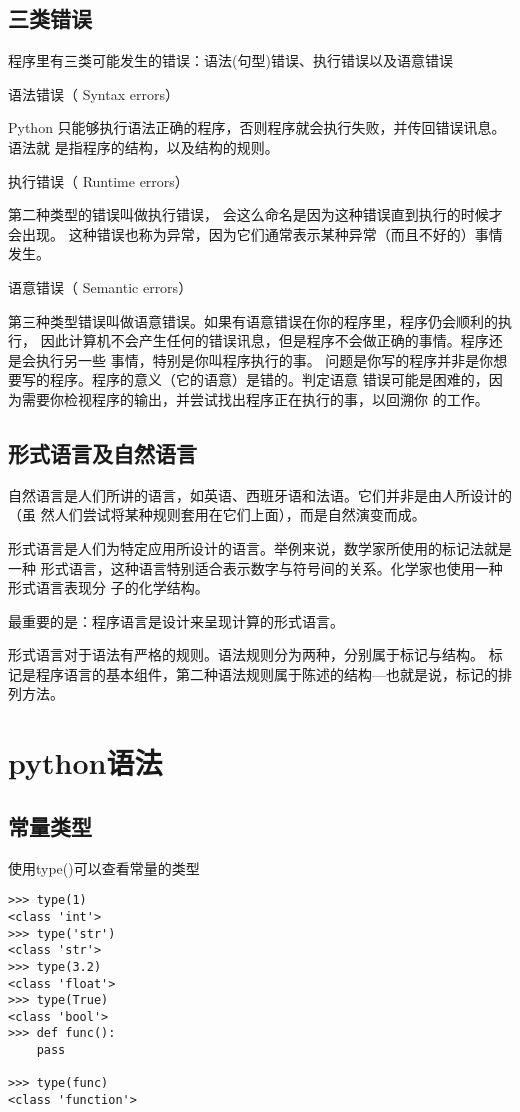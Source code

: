 \documentclass[twoside,11pt]{book}
\begin{document}
\subsection{三类错误}
程序里有三类可能发生的错误：语法(句型)错误、执行错误以及语意错误

语法错误（ Syntax errors）

Python 只能够执行语法正确的程序，否则程序就会执行失败，并传回错误讯息。 语法就
是指程序的结构，以及结构的规则。

执行错误（ Runtime errors）

第二种类型的错误叫做执行错误， 会这么命名是因为这种错误直到执行的时候才会出现。
这种错误也称为异常，因为它们通常表示某种异常（而且不好的）事情发生。

语意错误（ Semantic errors）

第三种类型错误叫做语意错误。如果有语意错误在你的程序里，程序仍会顺利的执行，
因此计算机不会产生任何的错误讯息，但是程序不会做正确的事情。程序还是会执行另一些
事情，特别是你叫程序执行的事。
问题是你写的程序并非是你想要写的程序。程序的意义（它的语意）是错的。判定语意
错误可能是困难的，因为需要你检视程序的输出，并尝试找出程序正在执行的事，以回溯你
的工作。

\subsection{形式语言及自然语言}
自然语言是人们所讲的语言，如英语、西班牙语和法语。它们并非是由人所设计的（虽
然人们尝试将某种规则套用在它们上面），而是自然演变而成。

形式语言是人们为特定应用所设计的语言。举例来说，数学家所使用的标记法就是一种
形式语言，这种语言特别适合表示数字与符号间的关系。化学家也使用一种形式语言表现分
子的化学结构。

最重要的是：程序语言是设计来呈现计算的形式语言。

形式语言对于语法有严格的规则。语法规则分为两种，分别属于标记与结构。
标记是程序语言的基本组件，第二种语法规则属于陈述的结构---也就是说，标记的排列方法。

\section{python语法}

\subsection{常量类型}
使用type()可以查看常量的类型

\begin{lstlisting}
>>> type(1)
<class 'int'>
>>> type('str')
<class 'str'>
>>> type(3.2)
<class 'float'>
>>> type(True)
<class 'bool'>
>>> def func():
	pass

>>> type(func)
<class 'function'>
\end{lstlisting}
\end{document}
